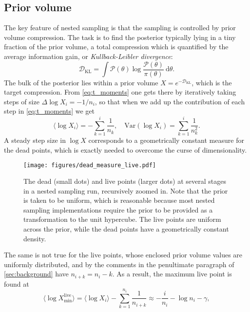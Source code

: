 \documentclass[usenatbib]{mnras}
\newcommand{\nlive}{n_i}
\newcommand{\DKL}{\mathcal{D}_\mathrm{KL}}
\begin{document}
\subsection{Prior volume}\label{sec:prior_volume}
The key feature of nested sampling is that the sampling is controlled by prior volume compression. The task is to find the posterior typically lying in a tiny fraction of the prior volume, a total compression which is quantified by the average information gain, or \textit{Kullback-Leibler divergence}:
\begin{equation}\label{eq:DKL}
   \DKL = \int \mathcal{P}(\theta) \log \frac{\mathcal{P}(\theta)}{\pi(\theta)}\ \mathrm{d}\theta. 
\end{equation}
The bulk of the posterior lies within a prior volume ${X = e^{-\DKL}}$, which is the target compression. From \cref{eq:t_moments} one gets there by iteratively taking steps of size ${\Delta \log X_i = -1/n_i}$, so that when we add up the contribution of each step in \cref{eq:t_moments} we get
\begin{equation}
    \langle\log X_i\rangle = -\sum_{k=1}^i \frac{1}{n_k}, \quad \mathrm{Var}(\log X_i) = \sum_{k=1}^i \frac{1}{n_k^2}.
\end{equation}
A steady step size in $\log X$ corresponds to a geometrically constant measure for the dead points, which is exactly needed to overcome the curse of dimensionality.
\begin{figure*}
\begin{center}
    \texttt{[image: figures/dead\_measure\_live.pdf]}
\end{center}
\caption{The dead (small dots) and live points (larger dots) at several stages in a nested sampling run, recursively zoomed in. Note that the prior is taken to be uniform, which is reasonable because most nested sampling implementations require the prior to be provided as a transformation to the unit hypercube. The live points are uniform across the prior, while the dead points have a geometrically constant density.}
\label{fig:dead_measure}
\end{figure*}
\par
The same is not true for the live points, whose enclosed prior volume values are uniformly distributed, and by the comments in the penultimate paragraph of \cref{sec:background} have ${n_{i+k} = n_i-k}$. As a result, the maximum live point is found at 
\begin{equation}\label{eq:Xmin}
    \langle\log X_\mathrm{min}^{\mathrm{live}}\rangle = \langle\log X_i\rangle - \sum_{k=1}^{\nlive} \frac{1}{n_{i+k}} \approx -\frac{i}{\nlive} - \log \nlive - \gamma,
\end{equation}
\end{document}
